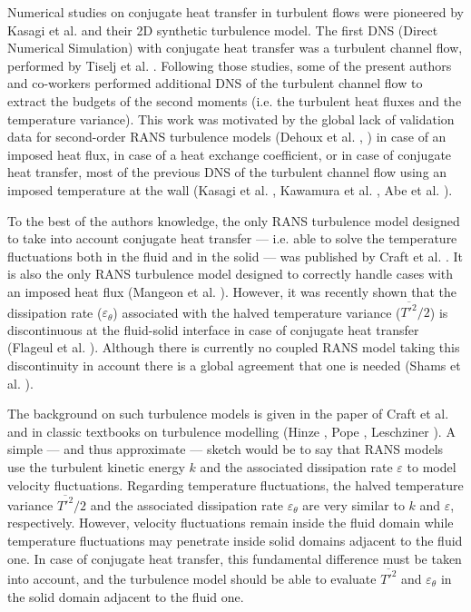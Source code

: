 \documentclass{svjour3}                     %
\begin{document}
Numerical studies on conjugate heat transfer in turbulent flows were pioneered by Kasagi et al. \cite{kasagi1989numerical} and their 2D synthetic turbulence model.
The first DNS (Direct Numerical Simulation) with conjugate heat transfer was a turbulent channel flow, performed by Tiselj et al. \cite{tiselj2001dns}.
Following those studies, some of the present authors and co-workers performed additional DNS of the turbulent channel flow \cite{flageul2015dns} to extract the budgets of the second moments (i.e. the turbulent heat fluxes and the temperature variance).
This work was motivated by the global lack of validation data for second-order RANS turbulence models (Dehoux et al. \cite{dehoux2017elliptic}, \cite{dehoux2012algebraic}) in case of an imposed heat flux, in case of a heat exchange coefficient, or in case of conjugate heat transfer, most of the previous DNS of the turbulent channel flow using an imposed temperature at the wall (Kasagi et al. \cite{kasagi1992direct}, Kawamura et al. \cite{kawamura1998dns}, Abe et al. \cite{abe2004surface}).%

To the best of the authors knowledge, the only RANS turbulence model designed to take into account conjugate heat transfer --- i.e. able to solve the temperature fluctuations both in the fluid and in the solid --- was published by Craft et al. \cite{craft2010towards}.
It is also the only RANS turbulence model designed to correctly handle cases with an imposed heat flux (Mangeon et al. \cite{mangeon2018thmt}).
However, it was recently shown that the dissipation rate ($\varepsilon_\theta$) associated with the halved temperature variance ($\overline{{T'}^2} / 2$) is discontinuous at the fluid-solid interface in case of conjugate heat transfer (Flageul et al. \cite{flageul2017discontinuity}).
Although there is currently no coupled RANS model taking this discontinuity in account there is a global agreement that one is needed (Shams et al. \cite{shams2018synthesis}).

The background on such turbulence models is given in the paper of Craft et al. \cite{craft2010towards} and in classic textbooks on turbulence modelling (Hinze \cite{hinze_turbulence}, Pope \cite{pope_turbulent}, Leschziner \cite{leschziner_turbulence}).
A simple --- and thus approximate --- sketch would be to say that RANS models use the turbulent kinetic energy $k$ and the associated dissipation rate $\varepsilon$ to model velocity fluctuations.
Regarding temperature fluctuations, the halved temperature variance $\overline{T'^2}/2$ and the associated dissipation rate $\varepsilon_\theta$ are very similar to $k$ and $\varepsilon$, respectively.
However, velocity fluctuations remain inside the fluid domain while temperature fluctuations may penetrate inside solid domains adjacent to the fluid one.
In case of conjugate heat transfer, this fundamental difference must be taken into account, and the turbulence model should be able to evaluate $\overline{T'^2}$ and $\varepsilon_\theta$ in the solid domain adjacent to the fluid one.
\end{document}
